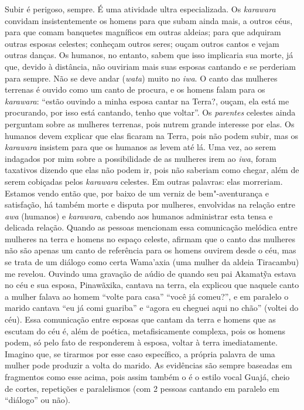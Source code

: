Subir é perigoso, sempre. É uma atividade ultra especializada. Os
\emph{karawara} convidam insistentemente os homens para que subam ainda
mais, a outros céus, para que comam banquetes magníficos em outras
aldeias; para que adquiram outras esposas celestes; conheçam outros
seres; ouçam outros cantos e vejam outras danças. Os humanos, no
entanto, sabem que isso implicaria sua morte, já que, devido à
distância, não ouviriam mais suas esposas cantando e se perderiam para
sempre. Não se deve andar (\emph{wata}) muito no \emph{iwa}. O canto das
mulheres terrenas é ouvido como um canto de procura, e os homens falam
para os \emph{karawara}: ``estão ouvindo a minha esposa cantar na Terra?,
ouçam, ela está me procurando, por isso está cantando, tenho que
voltar''. Os \emph{parentes} celestes ainda perguntam sobre as mulheres
terrenas, pois nutrem grande interesse por elas. Os humanos devem
explicar que elas ficaram na Terra, pois não podem subir, mas os
\emph{karawara} insistem para que os humanos as levem até lá. Uma vez,
ao serem indagados por mim sobre a possibilidade de as mulheres irem ao
\emph{iwa}, foram taxativos dizendo que elas não podem ir, pois não
saberiam como chegar, além de serem cobiçadas pelos \emph{karawara}
celestes. Em outras palavras: elas morreriam. Estamos vendo então que,
por baixo de um verniz de bem"-aventurança e satisfação, há também morte
e disputa por mulheres, envolvidas na relação entre \emph{awa} (humanos)
e \emph{karawara}, cabendo aos humanos administrar esta tensa e delicada
relação. Quando as pessoas mencionam essa comunicação melódica entre
mulheres na terra e homens no espaço celeste, afirmam que o canto das
mulheres não são apenas um canto de referência para os homens ouvirem
desde o céu, mas se trata de um diálogo como certa Wama'axia (uma mulher
da aldeia Tiracambu) me revelou. Ouvindo uma gravação de aúdio de quando
seu pai Akamatỹa estava no céu e sua esposa, Pinawãxika, cantava na
terra, ela explicou que naquele canto a mulher falava ao homem ``volte
para casa'' ``você já comeu?'', e em paralelo o marido cantava ``eu já
comi guariba'' e ``agora eu cheguei aqui no chão'' (voltei do céu). Essa
comunicação entre esposas que cantam da terra e homens que as escutam do
céu é, além de poética, metafisicamente complexa, pois os homens podem,
só pelo fato de responderem à esposa, voltar à terra imediatamente.
Imagino que, se tirarmos por esse caso específico, a própria palavra de
uma mulher pode produzir a volta do marido. As evidências são sempre
baseadas em fragmentos como esse acima, pois assim também o é o estilo
vocal Guajá, cheio de cortes, repetições e paralelismos (com 2 pessoas
cantando em paralelo em ``diálogo'' ou não).

